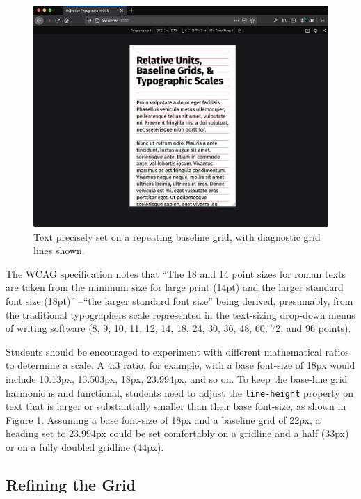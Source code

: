 \documentclass[sigconf,sigplan,review,anonymous]{acmart}
\begin{document}
\begin{figure}
  \includegraphics[width=\linewidth]{rdv-narrow}
  \caption{Text precisely set on a repeating baseline grid, with diagnostic grid lines shown.}
  \label{fig:rdv-narrow}
\end{figure}

The WCAG specification notes that “The 18 and 14 point sizes for roman texts are taken from the minimum size for large print (14pt) and the larger standard font size (18pt)” \cite{w3c:wcag}--“the larger standard font size” being derived, presumably, from the traditional typographers scale represented in the text-sizing drop-down menus of writing software (8, 9, 10, 11, 12, 14, 18, 24, 30, 36, 48, 60, 72, and 96 points).

Students should be encouraged to experiment with different mathematical ratios to determine a scale. A 4:3 ratio, for example, with a base font-size of 18px would include 10.13px, 13.503px, 18px, 23.994px, and so on.  To keep the base-line grid harmonious and functional, students need to adjust the \verb|line-height| property on text that is larger or substantially smaller than their base font-size, as shown in Figure \ref{fig:rdv-narrow}. Assuming a base font-size of 18px and a baseline grid of 22px, a heading set to 23.994px could be set comfortably on a gridline and a half (33px) or on a fully doubled gridline (44px).

\subsection{Refining the Grid}
\end{document}
